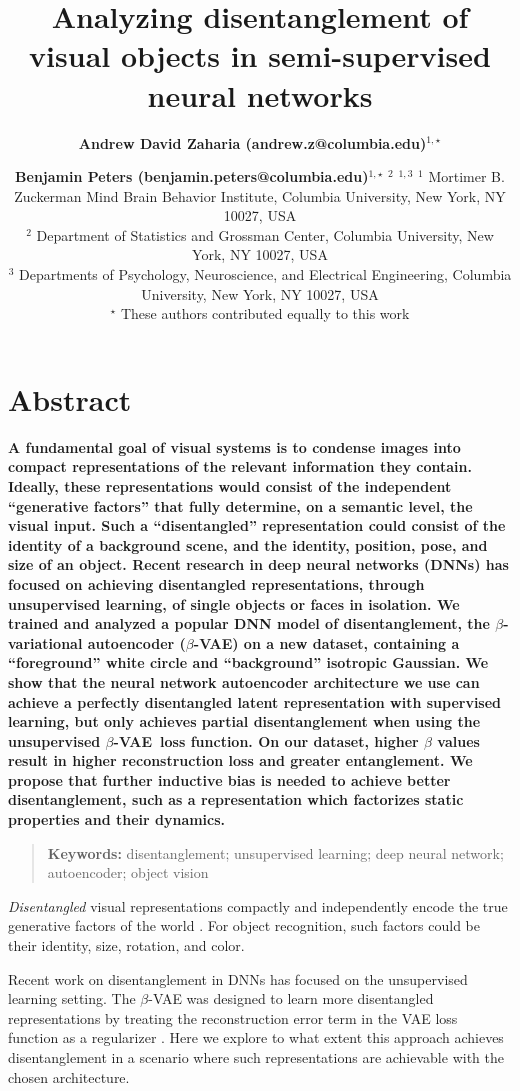 \documentclass[10pt,letterpaper]{article}
\title{Analyzing disentanglement of visual objects in semi-supervised neural networks}
\author{{\large \bf Andrew David Zaharia (andrew.z@columbia.edu)}$^{1,\star}$
  \and {\large \bf Benjamin Peters (benjamin.peters@columbia.edu)}$^{1,\star}$
  \AND {\large \bf John Cunningham (jpc2181@columbia.edu)}$^2$
  \AND {\large \bf Nikolaus Kriegeskorte (n.kriegeskorte@columbia.edu)}$^{1,3}$
  \AND $^1$ Mortimer B. Zuckerman Mind Brain Behavior Institute, Columbia University, New York, NY 10027, USA\\
  $^2$ Department of Statistics and Grossman Center, Columbia University, New York, NY 10027, USA\\
  $^3$ Departments of Psychology, Neuroscience, and Electrical Engineering, Columbia University, New York, NY 10027, USA\\
  $^\star$ These authors contributed equally to this work}
\newcommand{\bvae}{$\beta$-VAE~}
\begin{document}
\maketitle

\section{Abstract}
{
\bf
A fundamental goal of visual systems is to condense images into compact representations of the relevant information they contain. Ideally, these representations would consist of the independent ``generative factors'' that fully determine, on a semantic level, the visual input. Such a ``disentangled'' representation could consist of the identity of a background scene, and the identity, position, pose, and size of an object. Recent research in deep neural networks (DNNs) has focused on achieving disentangled representations, through unsupervised learning, of single objects or faces in isolation. We trained and analyzed a popular DNN model of disentanglement, the $\beta$-variational autoencoder ($\beta$-VAE) on a new dataset, containing a ``foreground'' white circle and ``background'' isotropic Gaussian. We show that the neural network autoencoder architecture we use can achieve a perfectly disentangled latent representation with supervised learning, but only achieves partial disentanglement when using the unsupervised \bvae loss function. On our dataset, higher $\beta$ values result in higher reconstruction loss and greater entanglement. We propose that further inductive bias is needed to achieve better disentanglement, such as a representation which factorizes static properties and their dynamics.
}
\begin{quote}
\small
\textbf{Keywords:} 
disentanglement; unsupervised learning; deep neural network; autoencoder; object vision
\end{quote}



 \textit{Disentangled} visual representations compactly and independently encode the true generative factors of the world \cite{DiCarlo2007,Bengio2009}. For object recognition, such factors could be their identity, size, rotation, and color.

 Recent work on disentanglement in DNNs has focused on the unsupervised learning setting. The $\beta$-VAE was designed to learn more disentangled representations by treating the reconstruction error term in the VAE loss function as a regularizer \cite{Higgins2017,Kingma2014}. Here we explore to what extent this approach achieves disentanglement in a scenario where such representations are achievable with the chosen architecture.
\end{document}
